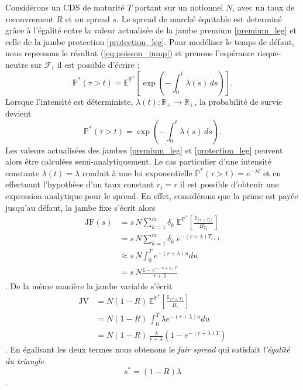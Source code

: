 Considérons un CDS de maturité $T$ portant sur un notionnel $N$, avec un taux de 
recouvrement $R$ et un spread $s$. Le spread de marché équitable est determiné grâce
à l'égalité entre la valeur actualisée de la jambe premium \eqref{premium_leg} 
et celle de la jambe protection \eqref{protection_leg}. Pour modéliser le temps de défaut, nous reprenons le résultat (\ref{eq:poisson_jump})
et prenons l'espérance risque-neutre sur $\mathcal{F}_t$ il est possible d'écrire :
\begin{equation}
\mathbb{P}^*(\tau > t) = \mathbb{E}^{\mathbb{P}^\ast}
\!\left[ \exp\left(-\int_0^t \lambda(s) \, ds\right) \right].
\end{equation}
Lorsque l'intensité est déterministe, $\lambda(t) : \mathbb{R}_+ \to \mathbb{R}_+$, 
la probabilité de survie devient
\begin{equation}
\mathbb{P}^*(\tau > t) = \exp\left(-\int_0^t \lambda(s) \, ds\right).
\end{equation}
Les valeurs actualisées des jambes \eqref{premium_leg} et \eqref{protection_leg} 
peuvent alors être calculées semi-analytiquement. Le cas particulier d'une intensité 
constante $\lambda(t) = \lambda$ conduit à une loi exponentielle 
$\mathbb{P}^*(\tau > t) = e^{-\lambda t}$ et en effectuant l'hypothèse d'un taux constant
$r_t=r$ il est possible d'obtenir une expression analytique pour le spread. En effet,
considérons que la prime est payée jusqu'au défaut, la jambe fixe s'écrit alors
\begin{equation}
    \begin{split}
        \text{JF}(s) &
        = s\,N \sum_{k=1}^m \delta_k \; \mathbb{E}^{\mathbb{P}^\ast} \!\left[\frac{\mathbb{1}_{\{\tau > T_k\}}}{B_{T_k}}\right] \\
        & = s\,N \sum_{k=1}^m \delta_k \; e^{-(r + \lambda)T_{i+1}} \\
        & \approx s\,N \int_0^T e^{-(r + \lambda)u} du \\
        & = s\,N \frac{1 - e^{-(r + \lambda)T}}{r + \lambda}
    \end{split}
\end{equation} .
De la même manière la jambe variable s'écrit
\begin{equation}
    \begin{split}
        \text{JV} &
        = N(1-R)\,\mathbb{E}^{\mathbb{P}^\ast} \!\left[\frac{\mathbb{1}_{\{\tau \le T\}}}{B_\tau}\right] \\
        & = N(1-R)\, \int_0^T \lambda e^{ - (r + \lambda)u} du \\
        & = N(1-R)\, \frac{\lambda}{r + \lambda} \left( 1 - e^{ - (r + \lambda)T} \right)
    \end{split} 
\end{equation} .
En égalisant les deux termes nous obtenons le \emph{fair spread} qui satisfait \emph{l'égalité du triangle}
\begin{equation}
    s^\ast = (1 - R) \lambda
\end{equation} .

